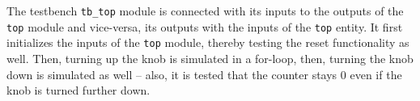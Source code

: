 \documentclass[a4paper,10pt]{scrartcl}
\begin{document}

The testbench \texttt{tb\_top} module is connected with its inputs to the outputs of the \texttt{top} module and vice-versa, its outputs with the inputs of the \texttt{top} entity. 
It first initializes the inputs of the \texttt{top} module, thereby testing the reset functionality as well. 
Then, turning up the knob is simulated in a for-loop, then, turning the knob down is simulated as well -- also, it is tested that the counter stays 0 even if the knob is turned further down. 



\end{document}
